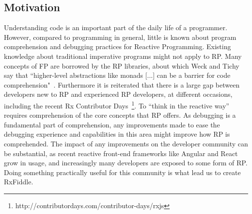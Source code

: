 \subsection{Motivation}
Understanding code is an important part of the daily life of a programmer. However, compared to programming in general, little is known about program comprehension and debugging practices for Reactive Programming. Existing knowledge about traditional imperative programs might not apply to RP. Many concepts of FP are borrowed by the RP libraries, about which Weck and Tichy say that ``higher-level abstractions like monads [...] can be a barrier for code comprehension"~\cite{weck2016visualizing}. Furthermore it is reiterated that there is a large gap between developers new to RP and experienced RP developers, at different occasions, including the recent Rx Contributor Days~\footnote{http://contributordays.com/contributor-days/rxjs}. To ``think in the reactive way'' requires comprehension of the core concepts that RP offers. As debugging is a fundamental part of comprehension, any improvements made to ease the debugging experience and capabilities in this area might improve how RP is comprehended.
The impact of any improvements on the developer community can be substantial, as recent reactive front-end frameworks like Angular and React grow in usage, and increasingly many developers are exposed to some form of RP. Doing something practically useful for this community is what lead us to create RxFiddle.

